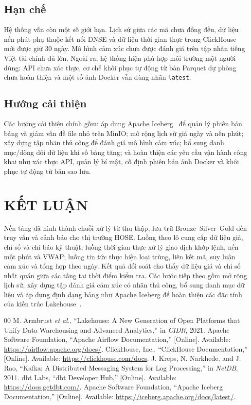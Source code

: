 \documentclass[conference,a4paper]{IEEEtran}
\newcommand{\code}[1]{\texttt{#1}}
\begin{document}
\subsection{Hạn chế}

Hệ thống vẫn còn một số giới hạn. Lịch sử giữa các mã chưa đồng đều, dữ liệu nến phút phụ thuộc kết nối DNSE và dữ liệu thời gian thực trong ClickHouse mới được giữ 30 ngày. Mô hình cảm xúc chưa được đánh giá trên tập nhãn tiếng Việt tài chính đủ lớn. Ngoài ra, hệ thống hiện phù hợp môi trường một người dùng: API chưa xác thực, cơ chế khôi phục tự động từ bản Parquet dự phòng chưa hoàn thiện và một số ảnh Docker vẫn dùng nhãn \code{latest}.

\subsection{Hướng cải thiện}
\label{sec:future}

Các hướng cải thiện chính gồm: áp dụng Apache Iceberg~\cite{iceberg} để quản lý phiên bản bảng và giảm vấn đề file nhỏ trên MinIO; mở rộng lịch sử giá ngày và nến phút; xây dựng tập nhãn thủ công để đánh giá mô hình cảm xúc; bổ sung danh mục/dòng dõi dữ liệu khi số bảng tăng; và hoàn thiện các yêu cầu vận hành công khai như xác thực API, quản lý bí mật, cố định phiên bản ảnh Docker và khôi phục tự động từ bản sao lưu.


\section{KẾT LUẬN}

Nền tảng đã hình thành chuỗi xử lý từ thu thập, lưu trữ Bronze--Silver--Gold đến truy vấn và cảnh báo cho thị trường HOSE. Luồng theo lô cung cấp dữ liệu giá, chỉ số và chỉ báo kỹ thuật; luồng thời gian thực xử lý giao dịch khớp lệnh, nến một phút và VWAP; luồng tin tức thực hiện loại trùng, liên kết mã, suy luận cảm xúc và tổng hợp theo ngày. Kết quả đối soát cho thấy dữ liệu giá và chỉ số nhất quán giữa các tầng tại thời điểm kiểm tra. Các bước tiếp theo gồm mở rộng lịch sử, xây dựng tập đánh giá cảm xúc có nhãn thủ công, bổ sung danh mục dữ liệu và áp dụng định dạng bảng như Apache Iceberg để hoàn thiện các đặc tính của kiến trúc Lakehouse~\cite{lakehouse}.

\begin{thebibliography}{00}
 M. Armbrust \textit{et al.}, ``Lakehouse: A New Generation of Open Platforms that Unify Data Warehousing and Advanced Analytics,'' in \textit{CIDR}, 2021.
 Apache Software Foundation, ``Apache Airflow Documentation,'' [Online]. Available: \url{https://airflow.apache.org/docs/}.
 ClickHouse, Inc., ``ClickHouse Documentation,'' [Online]. Available: \url{https://clickhouse.com/docs}.
 J. Kreps, N. Narkhede, and J. Rao, ``Kafka: A Distributed Messaging System for Log Processing,'' in \textit{NetDB}, 2011.
 dbt Labs, ``dbt Developer Hub,'' [Online]. Available: \url{https://docs.getdbt.com/}.
 Apache Software Foundation, ``Apache Iceberg Documentation,'' [Online]. Available: \url{https://iceberg.apache.org/docs/latest/}.
\end{thebibliography}
\end{document}

